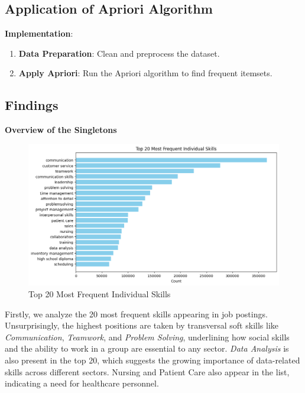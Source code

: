 \documentclass{article}
\begin{document}
\subsection{Application of Apriori Algorithm}

\textbf{Implementation}:
\begin{enumerate}
    \item \textbf{Data Preparation}: Clean and preprocess the dataset.
    \item \textbf{Apply Apriori}: Run the Apriori algorithm to find frequent itemsets.
\end{enumerate}

\subsection{Findings}

\vspace{0.5cm}
\textbf{Overview of the Singletons}

\vspace{0.3cm}
\begin{figure}[H]
    \centering
    \includegraphics[width=0.9\linewidth]{download (23).png}
    \caption{Top 20 Most Frequent Individual Skills}
    \label{fig:singletons}
\end{figure}

\vspace{0.3cm}
Firstly, we analyze the 20 most frequent skills appearing in job postings. Unsurprisingly, the highest positions are taken by transversal soft skills like \textit{Communication}, \textit{Teamwork}, and \textit{Problem Solving}, underlining how social skills and the ability to work in a group are essential to any sector.
\textit{Data Analysis} is also present in the top 20, which suggests the growing importance of data-related skills across different sectors. 
Nursing and Patient Care also appear in the list, indicating a need for healthcare personnel.
\end{document}
